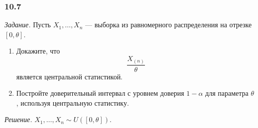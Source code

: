 \subsubsection*{10.7}

\textit{Задание.}
Пусть $X_1, \dotsc, X_n$ ---
выборка из равномерного распределения на отрезке $ \left[ 0, \theta \right] $.
\begin{enumerate}[label=\alph*)]
  \item Докажите, что
  $$ \frac{X_{ \left( n \right) }}{ \theta }$$
  является центральной статистикой.
  \item Постройте доверительный интервал с уровнем доверия $1 - \alpha $ для параметра $ \theta $,
  используя центральную статистику.
\end{enumerate}

\textit{Решение.} $X_1, \dotsc, X_n \sim U \left( \left[ 0, \theta \right] \right) $.
